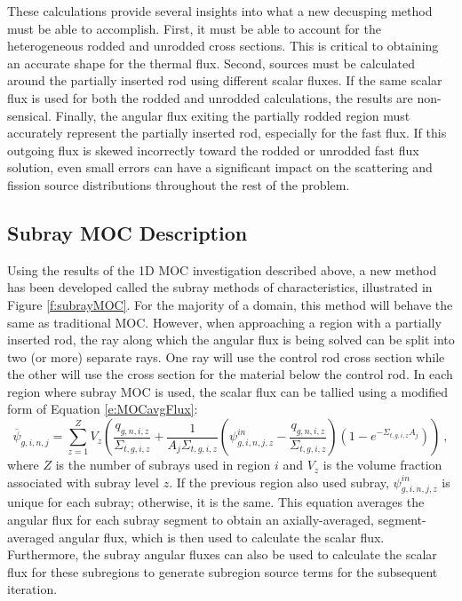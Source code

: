 These calculations provide several insights into what a new decusping method must be able to accomplish.  First, it must be able to account for the heterogeneous rodded and unrodded cross sections.  This is critical to obtaining an accurate shape for the thermal flux.  Second, sources must be calculated around the partially inserted rod using different scalar fluxes.  If the same scalar flux is used for both the rodded and unrodded calculations, the results are non-sensical.  Finally, the angular flux exiting the partially rodded region must accurately represent the partially inserted rod, especially for the fast flux.  If this outgoing flux is skewed incorrectly toward the rodded or unrodded fast flux solution, even small errors can have a significant impact on the scattering and fission source distributions throughout the rest of the problem.

\subsection{Subray MOC Description}

Using the results of the 1D MOC investigation described above, a new method has been developed called the subray methods of characteristics, illustrated in Figure \ref{f:subrayMOC}.  For the majority of a domain, this method will behave the same as traditional MOC.  However, when approaching a region with a partially inserted rod, the ray along which the angular flux is being solved can be split into two (or more) separate rays.  One ray will use the control rod cross section while the other will use the cross section for the material below the control rod.  In each region where subray MOC is used, the scalar flux can be tallied using a modified form of Equation \ref{e:MOCavgFlux}:
\begin{equation}
\overline{\psi}_{g,i,n,j} = \sum_{z=1}^Z V_z \left(\frac{q_{g,n,i,z}}{\Sigma_{t,g,i,z}} + \frac{1}{A_j\Sigma_{t,g,i,z}}\left(\psi^{in}_{g,i,n,j,z} - \frac{q_{g,n,i,z}}{\Sigma_{t,g,i,z}}\right)\left(1 - e^{-\Sigma_{t,g,i,z} A_j}\right)\right)\ ,
\end{equation}
where $Z$ is the number of subrays used in region $i$ and $V_z$ is the volume fraction associated with subray level $z$.  If the previous region also used subray, $\psi^{in}_{g,i,n,j,z}$ is unique for each subray; otherwise, it is the same.  This equation averages the angular flux for each subray segment to obtain an axially-averaged, segment-averaged angular flux, which is then used to calculate the scalar flux.  Furthermore, the subray angular fluxes can also be used to calculate the scalar flux for these subregions to generate subregion source terms for the subsequent iteration.

